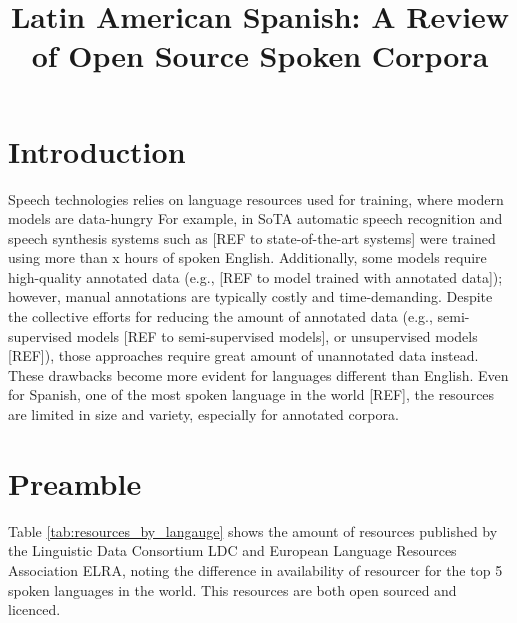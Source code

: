 \documentclass[10pt, a4paper]{article}
\title{Latin American Spanish: A Review of Open Source Spoken Corpora}
\begin{document}
\maketitleabstract


\section{Introduction}

Speech technologies relies on language resources used for training, where modern models are data-hungry For example, in SoTA automatic speech recognition and speech synthesis  systems such as [REF to state-of-the-art systems] were trained using more than x hours of spoken English. Additionally, some models require high-quality annotated data (e.g., [REF to model trained with annotated data]); however, manual annotations are typically costly and time-demanding. Despite the collective efforts for reducing the amount of annotated data (e.g., semi-supervised models [REF to semi-supervised models], or unsupervised models [REF]), those approaches require great amount of unannotated data instead. These drawbacks become more evident for languages different than English. Even for Spanish, one of the most spoken language in the world [REF], the resources are limited in size and variety, especially for annotated corpora.





\section{Preamble}
Table \ref{tab:resources_by_langauge} shows the amount of resources published by the Linguistic Data Consortium LDC and European Language Resources Association ELRA, noting the difference in availability of resourcer for the top 5 spoken languages in the world. This resources are both open sourced and licenced.
\end{document}
